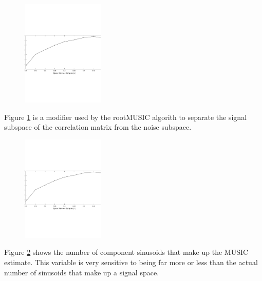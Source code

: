 \documentclass{allertonproc}
\begin{document}
\begin{figure}[ht!]
\begin{center}
\includegraphics[height=2in]{wavelengths}
\caption{}\label{thresh}
\end{center}
\end{figure}

Figure \ref{thresh} is a modifier used by the rootMUSIC algorith to separate the signal subspace of the correlation matrix from the noise subspace. 

\begin{figure}[ht!]
\begin{center}
\includegraphics[height=2in]{wavelengths}
\caption{}\label{sinusoid}
\end{center}
\end{figure}

Figure \ref{sinusoid} shows the number of component sinusoids that make up the MUSIC estimate. This variable is very sensitive to being far more or less than the actual number of sinusoids that make up a signal space. %

\end{document}
